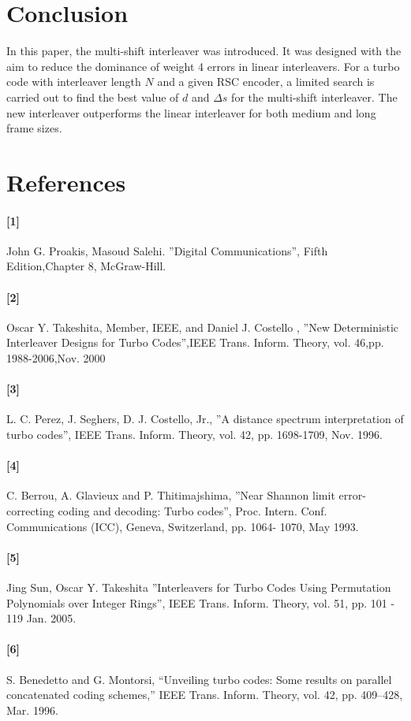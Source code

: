 \documentclass[twocolumn]{article}
\begin{document}
\section{Conclusion}
In this paper, the multi-shift interleaver was introduced. It was designed with the aim
to reduce the dominance of weight 4 errors in linear interleavers. For a turbo code
with interleaver length $N$ and a given RSC encoder, a limited search is carried out to 
find the best value of $d$ and $\Delta s$ for the multi-shift interleaver. The new 
interleaver outperforms the linear interleaver for both medium and long frame sizes. 
\section{References}
\paragraph{[1]}   John G. Proakis, Masoud Salehi. ''Digital Communications'', 
Fifth Edition,Chapter 8, McGraw-Hill.
\paragraph{[2]}  Oscar Y. Takeshita, Member, IEEE, and Daniel J. Costello ,
''New Deterministic Interleaver Designs for Turbo Codes'',IEEE Trans. Inform. 
Theory, vol.  46,pp. 1988-2006,Nov. 2000
\paragraph{[3]}  L. C. Perez, J. Seghers, D. J. Costello, Jr.,
 ''A distance spectrum interpretation of turbo codes'', IEEE Trans. Inform. Theory, 
 vol. 42, pp. 1698-1709, Nov. 1996.
\paragraph{[4]}  C. Berrou, A. Glavieux and P. Thitimajshima, 
''Near Shannon limit error-correcting coding and
decoding: Turbo codes'', Proc. Intern. Conf. Communications (ICC), Geneva, 
Switzerland, pp. 1064-
1070, May 1993. 
\paragraph{[5]}  Jing Sun, Oscar Y. Takeshita ''Interleavers for Turbo Codes Using 
Permutation Polynomials over Integer Rings'', IEEE Trans. Inform. Theory, vol. 51, 
pp. 101 - 119  Jan. 2005.
\paragraph{[6]} S. Benedetto and G. Montorsi, “Unveiling turbo codes: Some results
on parallel concatenated coding schemes,” IEEE Trans. Inform. Theory,
vol. 42, pp. 409–428, Mar. 1996.
\end{document}
